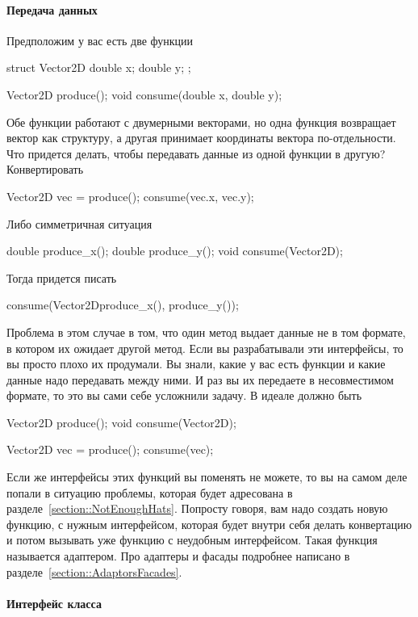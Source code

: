 \paragraph{Передача данных}

Предположим у вас есть две функции
\begin{cppcode}
struct Vector2D {
  double x;
  double y;
};

Vector2D produce();
void consume(double x, double y);
\end{cppcode}
Обе функции работают с двумерными векторами, но одна функция возвращает вектор как структуру, а другая принимает координаты вектора по-отдельности.
Что придется делать, чтобы передавать данные из одной функции в другую?
Конвертировать
\begin{cppcode}
Vector2D vec = produce();
consume(vec.x, vec.y);
\end{cppcode}
Либо симметричная ситуация
\begin{cppcode}
double produce_x();
double produce_y();
void consume(Vector2D);
\end{cppcode}
Тогда придется писать
\begin{cppcode}
consume(Vector2D{produce_x(), produce_y()});
\end{cppcode}
Проблема в этом случае в том, что один метод выдает данные не в том формате, в котором их ожидает другой метод.
Если вы разрабатывали эти интерфейсы, то вы просто плохо их продумали.
Вы знали, какие у вас есть функции и какие данные надо передавать между ними.
И раз вы их передаете в несовместимом формате, то это вы сами себе усложнили задачу.
В идеале должно быть
\begin{cppcode}
Vector2D produce();
void consume(Vector2D);

Vector2D vec = produce();
consume(vec);
\end{cppcode}
Если же интерфейсы этих функций вы поменять не можете, то вы на самом деле попали в ситуацию проблемы, которая будет адресована в разделе~\ref{section::NotEnoughHats}.
Попросту говоря, вам надо создать новую функцию, с нужным интерфейсом, которая будет внутри себя делать конвертацию и потом вызывать уже функцию с неудобным интерфейсом.
Такая функция называется адаптером.
Про адаптеры и фасады подробнее написано в разделе~\ref{section::AdaptorsFacades}.

\paragraph{Интерфейс класса}
\label{section::SignedUnsigned}

